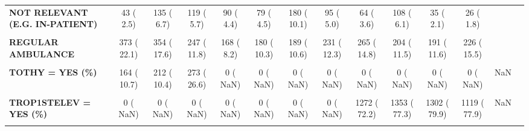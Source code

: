 \documentclass[
]{article}
\begin{document}
\begin{table}[H]
\begin{tabular}[t]{>{\raggedright\arraybackslash}p{5em}ccccccccccccc}
\textbf{NOT RELEVANT (E.G. IN-PATIENT)} & 43 (  2.5) & 135 (  6.7) & 119 (  5.7) & 90 (  4.4) & 79 (  4.5) & 180 ( 10.1) & 95 (  5.0) & 64 (  3.6) & 108 (  6.1) & 35 (  2.1) & 26 (  1.8) &  & \\
\textbf{\cellcolor{gray!10}{PRIVATE CAR / INDEPENDENTLY}} & \cellcolor{gray!10}{771 ( 45.6)} & \cellcolor{gray!10}{880 ( 43.8)} & \cellcolor{gray!10}{940 ( 45.0)} & \cellcolor{gray!10}{976 ( 47.4)} & \cellcolor{gray!10}{795 ( 45.6)} & \cellcolor{gray!10}{785 ( 44.1)} & \cellcolor{gray!10}{877 ( 46.5)} & \cellcolor{gray!10}{747 ( 41.7)} & \cellcolor{gray!10}{706 ( 39.7)} & \cellcolor{gray!10}{705 ( 42.8)} & \cellcolor{gray!10}{589 ( 40.4)} & \cellcolor{gray!10}{} & \cellcolor{gray!10}{}\\
\textbf{REGULAR AMBULANCE} & 373 ( 22.1) & 354 ( 17.6) & 247 ( 11.8) & 168 (  8.2) & 180 ( 10.3) & 189 ( 10.6) & 231 ( 12.3) & 265 ( 14.8) & 204 ( 11.5) & 191 ( 11.6) & 226 ( 15.5) &  & \\
\textbf{\cellcolor{gray!10}{TNIT = YES (\%)}} & \cellcolor{gray!10}{451 ( 27.6)} & \cellcolor{gray!10}{479 ( 23.4)} & \cellcolor{gray!10}{424 ( 41.2)} & \cellcolor{gray!10}{2 (  0.1)} & \cellcolor{gray!10}{0 (  NaN)} & \cellcolor{gray!10}{0 (  NaN)} & \cellcolor{gray!10}{0 (  NaN)} & \cellcolor{gray!10}{0 (  NaN)} & \cellcolor{gray!10}{0 (  NaN)} & \cellcolor{gray!10}{0 (  NaN)} & \cellcolor{gray!10}{0 (  NaN)} & \cellcolor{gray!10}{NaN} & \cellcolor{gray!10}{}\\
\textbf{TOTHY = YES (\%)} & 164 ( 10.7) & 212 ( 10.4) & 273 ( 26.6) & 0 (  NaN) & 0 (  NaN) & 0 (  NaN) & 0 (  NaN) & 0 (  NaN) & 0 (  NaN) & 0 (  NaN) & 0 (  NaN) & NaN & \\
\textbf{\cellcolor{gray!10}{TROP1ST (mean (SD))}} & \cellcolor{gray!10}{NaN (NA)} & \cellcolor{gray!10}{NaN (NA)} & \cellcolor{gray!10}{NaN (NA)} & \cellcolor{gray!10}{NaN (NA)} & \cellcolor{gray!10}{NaN (NA)} & \cellcolor{gray!10}{NaN (NA)} & \cellcolor{gray!10}{NaN (NA)} & \cellcolor{gray!10}{1024.17 (7727.02)} & \cellcolor{gray!10}{2.69 (17.35)} & \cellcolor{gray!10}{2272.23 (13881.28)} & \cellcolor{gray!10}{2426.45 (15349.82)} & \cellcolor{gray!10}{<0.001} & \cellcolor{gray!10}{}\\
\textbf{TROP1STELEV = YES (\%)} & 0 (  NaN) & 0 (  NaN) & 0 (  NaN) & 0 (  NaN) & 0 (  NaN) & 0 (  NaN) & 0 (  NaN) & 1272 ( 72.2) & 1353 ( 77.3) & 1302 ( 79.9) & 1119 ( 77.9) & NaN & \\
\textbf{\cellcolor{gray!10}{TTLX = YES (\%)}} & \cellcolor{gray!10}{10 (  0.6)} & \cellcolor{gray!10}{1 (  0.0)} & \cellcolor{gray!10}{0 (  0.0)} & \cellcolor{gray!10}{0 (  NaN)} & \cellcolor{gray!10}{0 (  NaN)} & \cellcolor{gray!10}{0 (  NaN)} & \cellcolor{gray!10}{0 (  NaN)} & \cellcolor{gray!10}{0 (  NaN)} & \cellcolor{gray!10}{0 (  NaN)} & \cellcolor{gray!10}{0 (  NaN)} & \cellcolor{gray!10}{0 (  NaN)} & \cellcolor{gray!10}{NaN} & \cellcolor{gray!10}{}\\

\end{tabular}
\end{table}
\end{document}

